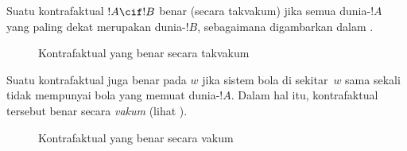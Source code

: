 \documentclass[../../../include/open-logic-section]{subfiles}
\begin{document}


Suatu kontrafaktual $!A \cif !B$ benar (secara takvakum) jika semua
dunia-$!A$ yang paling dekat merupakan dunia-$!B$, sebagaimana digambarkan
dalam .
\begin{figure}
\begin{center}
\caption{Kontrafaktual yang benar secara takvakum}
\end{center}
\end{figure}
Suatu kontrafaktual juga benar pada $w$ jika sistem bola di sekitar~$w$
sama sekali tidak mempunyai bola yang memuat dunia-$!A$. Dalam hal itu,
kontrafaktual tersebut benar secara \emph{vakum} (lihat
).
\begin{figure}
\begin{center}
\caption{Kontrafaktual yang benar secara vakum}
\end{center}
\end{figure}
\end{document}
